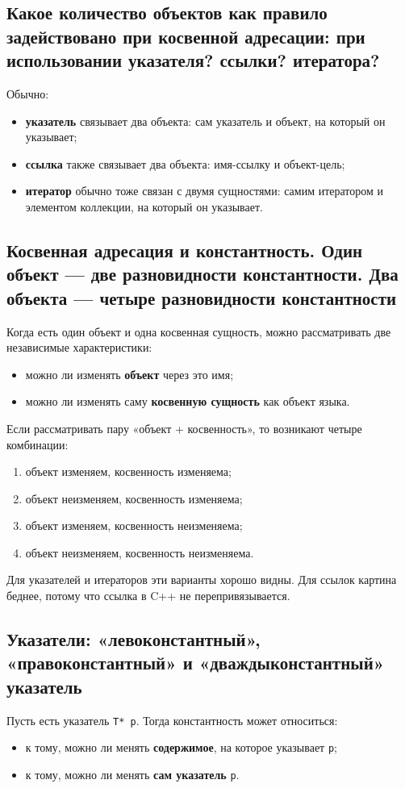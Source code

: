 \subsection{Какое количество объектов как правило задействовано при косвенной адресации: при использовании указателя? ссылки? итератора?}
Обычно:
\begin{itemize}
    \item \textbf{указатель} связывает два объекта: сам указатель и объект, на который он указывает;
    \item \textbf{ссылка} также связывает два объекта: имя-ссылку и объект-цель;
    \item \textbf{итератор} обычно тоже связан с двумя сущностями: самим итератором и элементом коллекции, на который он указывает.
\end{itemize}

\subsection{Косвенная адресация и константность. Один объект — две разновидности константности. Два объекта — четыре разновидности константности}
Когда есть один объект и одна косвенная сущность, можно рассматривать две независимые характеристики:
\begin{itemize}
    \item можно ли изменять \textbf{объект} через это имя;
    \item можно ли изменять саму \textbf{косвенную сущность} как объект языка.
\end{itemize}

Если рассматривать пару «объект + косвенность», то возникают четыре комбинации:
\begin{enumerate}
    \item объект изменяем, косвенность изменяема;
    \item объект неизменяем, косвенность изменяема;
    \item объект изменяем, косвенность неизменяема;
    \item объект неизменяем, косвенность неизменяема.
\end{enumerate}

\begin{remark}
Для указателей и итераторов эти варианты хорошо видны. Для ссылок картина беднее, потому что ссылка в C++ не перепривязывается.
\end{remark}

\subsection{Указатели: «левоконстантный», «правоконстантный» и «дваждыконстантный» указатель}
Пусть есть указатель \texttt{T* p}. Тогда константность может относиться:
\begin{itemize}
    \item к тому, можно ли менять \textbf{содержимое}, на которое указывает \texttt{p};
    \item к тому, можно ли менять \textbf{сам указатель} \texttt{p}.
\end{itemize}

